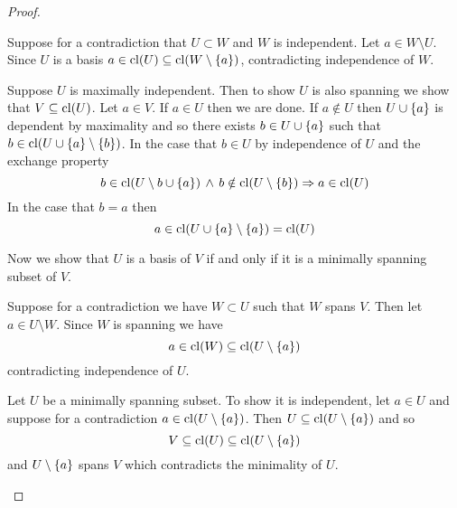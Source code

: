 \begin{proof}
\begin{enumerate}
            \begin{forward}
                Suppose for a contradiction that
                $U \subset W$ and $W$ is independent.
                Let $a \in W \setminus U$.
                Since $U$ is a basis 
                $a \in \operatorname{cl}(U) \subseteq \operatorname{cl}(W \setminus \left\{a\right\})$, 
                contradicting independence of $W$.
            \end{forward}

            \begin{backward}
                Suppose $U$ is maximally independent.
                Then to show $U$ is also spanning we show that $V \subseteq \operatorname{cl}(U)$.
                Let $a \in V$. 
                If $a \in U$ then we are done.
                If $a \notin U$ then $U \cup \left\{a\right\}$ is dependent by maximality
                and so there exists $b \in U \cup \left\{a\right\}$ such that 
                $b \in \operatorname{cl}(U \cup \left\{a\right\} \setminus \left\{b\right\})$.
                In the case that $b \in U$ by independence of $U$ and the 
                exchange property
                \[b \in \operatorname{cl}(U \setminus {b} \cup \left\{a\right\}) \, \land \, 
                b \notin \operatorname{cl}(U \setminus \left\{b\right\}) \Rightarrow 
                a \in \operatorname{cl}(U)\]
                In the case that $b = a$ then 
                \[a \in \operatorname{cl}(U \cup \left\{a\right\} \setminus \left\{a\right\}) = \operatorname{cl}(U)\]
            \end{backward}

            Now we show that $U$ is a basis of $V$ if and only if it is a 
            minimally spanning subset of $V$.

            \begin{forward}
                Suppose for a contradiction we have $W \subset U$ such that 
                $W$ spans $V$.
                Then let $a \in U \setminus W$.
                Since $W$ is spanning we have 
                \[a \in \operatorname{cl}(W) \subseteq \operatorname{cl}(U \setminus \left\{a\right\})\]
                contradicting independence of $U$.
            \end{forward}

            \begin{backward}
                Let $U$ be a minimally spanning subset.
                To show it is independent, 
                let $a \in U$ and suppose for a contradiction 
                $a \in \operatorname{cl}(U \setminus \left\{a\right\})$.
                Then $U \subseteq \operatorname{cl}(U \setminus \left\{a\right\})$ and so 
                \[V \subseteq \operatorname{cl}(U) \subseteq \operatorname{cl}(U \setminus \left\{a\right\})\]
                and $U \setminus \left\{a\right\}$ spans $V$
                which contradicts the minimality of $U$.
            \end{backward}
    \end{enumerate}
\end{proof}

